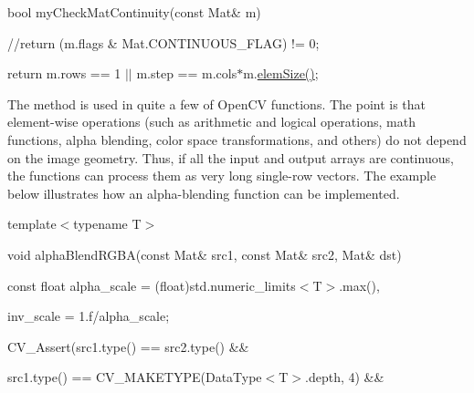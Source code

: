 {\ttfamily bool my\+Check\+Mat\+Continuity(const Mat\& m)}

{\ttfamily }

{\ttfamily }

{\ttfamily //return (m.\+flags \& Mat.\+C\+O\+N\+T\+I\+N\+U\+O\+U\+S\+\_\+\+F\+L\+AG) != 0;}

{\ttfamily }

{\ttfamily }

{\ttfamily return m.\+rows == 1 $\vert$$\vert$ m.\+step == m.\+cols$\ast$m.\mbox{\hyperlink{classorg_1_1opencv_1_1core_1_1_mat_aefa109235b149088d48188cb54b891e9}{elem\+Size()}};}

{\ttfamily }

{\ttfamily }

{\ttfamily The method is used in quite a few of Open\+CV functions. The point is that element-\/wise operations (such as arithmetic and logical operations, math functions, alpha blending, color space transformations, and others) do not depend on the image geometry. Thus, if all the input and output arrays are continuous, the functions can process them as very long single-\/row vectors. The example below illustrates how an alpha-\/blending function can be implemented.}

{\ttfamily }

{\ttfamily }

{\ttfamily template$<$typename T$>$}

{\ttfamily }

{\ttfamily }

{\ttfamily void alpha\+Blend\+R\+G\+B\+A(const Mat\& src1, const Mat\& src2, Mat\& dst)}

{\ttfamily }

{\ttfamily }

{\ttfamily const float alpha\+\_\+scale = (float)std.\+numeric\+\_\+limits$<$\+T$>$.\+max(),}

{\ttfamily }

{\ttfamily }

{\ttfamily inv\+\_\+scale = 1.\+f/alpha\+\_\+scale;}

{\ttfamily }

{\ttfamily }

{\ttfamily C\+V\+\_\+\+Assert(src1.\+type() == src2.\+type() \&\&}

{\ttfamily }

{\ttfamily }

{\ttfamily src1.\+type() == C\+V\+\_\+\+M\+A\+K\+E\+T\+Y\+PE(Data\+Type$<$\+T$>$.\+depth, 4) \&\&}

